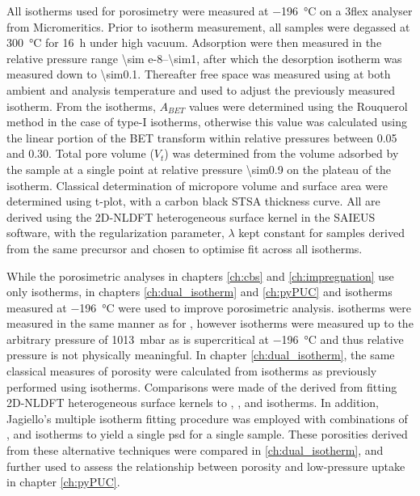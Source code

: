 All  isotherms used for porosimetry were measured at \qty{-196}{\degreeCelsius} on a 3flex analyser from Micromeritics. Prior to isotherm measurement, all samples were degassed at \qty{300}{\degreeCelsius} for \qty{16}{\hour} under high vacuum. Adsorption were then measured in the relative pressure range \numrange{\sim e-8}{\sim1}, after which the desorption isotherm was measured down to \num{\sim0.1}. Thereafter free space was measured using  at both ambient and analysis temperature and used to adjust the previously measured isotherm. From the isotherms, $A_{BET}$ values were determined using the Rouquerol method in the case of type-I isotherms,\citep{Rouquerol2007Is} otherwise this value was calculated using the linear portion of the BET transform within relative pressures between 0.05 and 0.30. Total pore volume ($V_t$) was determined from the volume adsorbed by the sample at a single point at relative pressure \num{\sim0.9} on the plateau of the isotherm. Classical determination of \gls{micropore} volume and surface area were determined using t-plot, with a carbon black STSA thickness curve. All  are derived using the 2D-NLDFT heterogeneous surface kernel in the SAIEUS software,\citep{Jagiello20132D} with the regularization parameter, $\lambda$\citep{Hansen1992Analysis, Hansen2001L} kept constant for samples derived from the same precursor and chosen to optimise fit across all isotherms. 

While the porosimetric analyses in chapters \ref{ch:cbs} and \ref{ch:impregnation} use only  isotherms, in chapters \ref{ch:dual_isotherm} and \ref{ch:pyPUC}   and  isotherms measured at \qty{-196}{\degreeCelsius} were used to improve porosimetric analysis.  isotherms were measured in the same manner as for , however  isotherms were measured up to  the arbitrary pressure of \qty{1013}{\milli\bar} as  is supercritical at \qty{-196}{\degreeCelsius} and thus relative pressure is not physically meaningful. In chapter \ref{ch:dual_isotherm}, the same classical measures of porosity were calculated from  isotherms as previously performed using  isotherms. Comparisons were made of the  derived from fitting 2D-NLDFT heterogeneous surface kernels to , , and  isotherms. In addition, Jagiello's multiple isotherm fitting procedure\citep{Jagiello2015Dual} was employed with combinations of ,  and  isotherms to yield a single \acrshort{psd} for a single sample. These porosities derived from these alternative techniques were compared in \ref{ch:dual_isotherm}, and further used to assess the relationship between porosity and low-pressure  uptake in chapter \ref{ch:pyPUC}.

